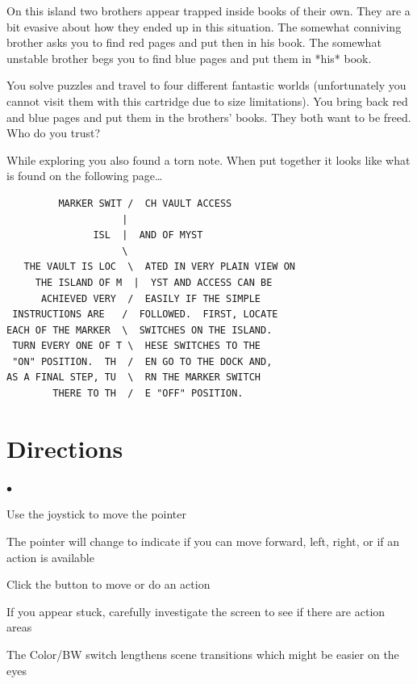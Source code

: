 \documentclass{book}
\newenvironment{list1}%
{\begin{list}{$\bullet$}{\setlength{\parsep}{0.05ex}\setlength{\itemsep}{0mm}}}
{\end{list}\normalsize}
\begin{document}
	On this island two brothers appear trapped inside books
	of their own.  They are a bit evasive about how they
	ended up in this situation.  The somewhat conniving
	brother asks you to find red pages and put then in his book.
	The somewhat unstable brother begs you to find blue pages
	and put them in *his* book.

	You solve puzzles and travel to four different fantastic worlds
	(unfortunately you cannot visit them with this cartridge
	due to size limitations).
	You bring back red and blue pages and put them in the brothers' books.
	They both want to be freed.  Who do you trust?

	While exploring you also found a torn note.
	When put together it
	looks like what is found on the following page\dots
\vfill

\pagebreak
\begin{small}
\begin{verbatim}
         MARKER SWIT /  CH VAULT ACCESS
                    |
               ISL  |  AND OF MYST
                    \
   THE VAULT IS LOC  \  ATED IN VERY PLAIN VIEW ON
     THE ISLAND OF M  |  YST AND ACCESS CAN BE
      ACHIEVED VERY  /  EASILY IF THE SIMPLE
 INSTRUCTIONS ARE   /  FOLLOWED.  FIRST, LOCATE
EACH OF THE MARKER  \  SWITCHES ON THE ISLAND.
 TURN EVERY ONE OF T \  HESE SWITCHES TO THE
 "ON" POSITION.  TH  /  EN GO TO THE DOCK AND,
AS A FINAL STEP, TU  \  RN THE MARKER SWITCH
        THERE TO TH  /  E "OFF" POSITION.
\end{verbatim}
\end{small}


\pagebreak

\section*{Directions}

\begin{list1}
\item Use the joystick to move the pointer
\item The pointer will change to indicate if you can move forward, left, right, or
	if an action is available
\item Click the button to move or do an action
\item If you appear stuck, carefully investigate the screen to see if there
	are action areas
\item The Color/BW switch lengthens scene transitions which
	might be easier on the eyes
\end{list1}
\end{document}
